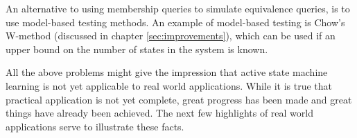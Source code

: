 \documentclass[multi,crop=false,class=article]{standalone}
\begin{document}
An alternative to using membership queries to simulate equivalence queries, is
to use model-based testing methods\cite{Broy2005, Tretmans2011}. An example of
model-based testing is Chow's W-method\cite{Chow1978} (discussed in chapter
\cref{sec:improvements}), which can be used if an upper bound on the number of
states in the system is known.


All the above problems might give the impression that active state machine
learning is not yet applicable to real world applications. While it is true that
practical application is not yet complete, great progress has been made and
great things have already been achieved. The next few highlights of real world
applications serve to illustrate these facts.
\end{document}
